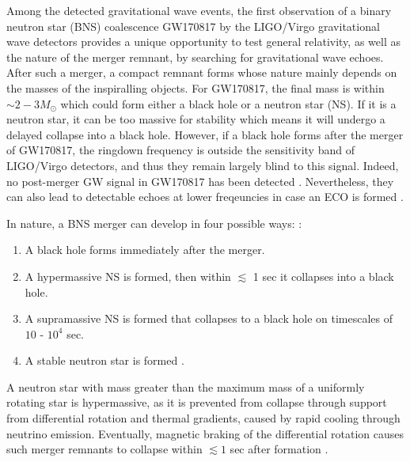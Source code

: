 \documentclass[12pt]{article}
\begin{document}
Among the detected gravitational wave events, the first observation of a binary neutron star (BNS) coalescence GW170817 by the LIGO/Virgo gravitational wave detectors \cite{TheLIGOScientific:2017qsa,Abbott:2017dke} provides a unique opportunity to test general relativity, as well as the nature of the merger remnant, by searching for gravitational wave echoes.  
 After such a merger, a compact remnant forms whose nature mainly depends on the masses of the inspiralling objects. For GW170817, the final mass is within $\sim 2-3 M_{\odot}$ which could form either a black hole or a neutron star (NS). If it is a neutron star, it can be too massive for stability which means it will undergo a delayed collapse into a black hole. However, if a  black hole forms after the merger of GW170817, the ringdown frequency is outside the sensitivity band of LIGO/Virgo detectors, and thus they remain largely blind to this signal. Indeed, no post-merger GW signal in GW170817 has been detected \cite{Abbott:2017dke}. Nevertheless,  they can also lead to detectable echoes at lower freqeuncies in case an ECO is formed \cite{Cardoso:2016oxy}.

In nature, a BNS merger can develop in four possible ways: \cite{Abbott:2017dke}:
\begin{enumerate}
\item A black hole forms immediately after the merger.

\item A hypermassive NS is formed, then within $\lesssim$ 1 sec it collapses into a black hole.

\item A supramassive NS is formed that collapses to a black hole on timescales of $10$ - $10^{4}$ sec.

\item A stable neutron star is formed \cite{TheLIGOScientific:2017qsa}.

\end{enumerate}


A neutron star with mass greater than the maximum mass of a uniformly rotating star is hypermassive, as it is prevented from collapse through support from differential rotation and thermal gradients, caused by rapid cooling through neutrino emission.  
Eventually, magnetic braking of the differential rotation causes  such merger remnants to collapse within $\lesssim 1$  sec after formation \cite{Shapiro:2000zh,Hotokezaka:2013iia}.
\end{document}
